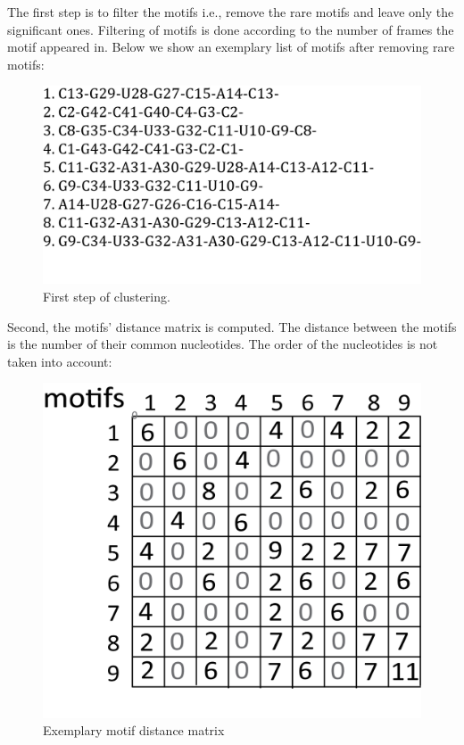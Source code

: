\documentclass[12pt]{article}
\begin{document}
The first step is to filter the motifs i.e., remove the rare motifs  and leave only the significant ones. Filtering of motifs is done according to the number of frames the motif appeared in. Below we show an exemplary list of motifs after removing rare motifs:

\begin{figure}[h!]
\centering
\includegraphics[scale=1]{./pictures/cluster_motif_step1.png}
\caption{First step of clustering.}
\label{MotifsClusteringStep1}
\end{figure}

Second, the motifs' distance matrix is computed. The distance between the motifs is the number of their common nucleotides. The order of the nucleotides is not taken into account:
\begin{figure}[h!]
\centering
\includegraphics[scale=0.6]{./pictures/cluster_motif_step2.png}
\caption{Exemplary motif distance matrix}
\label{MotifsClusteringStep2}
\end{figure}
\end{document}
